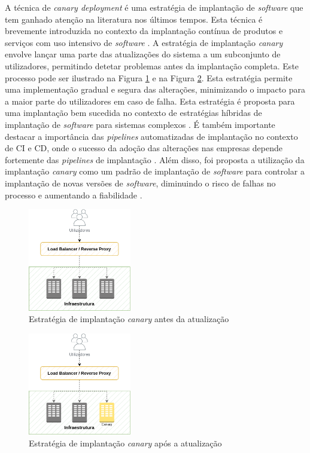 A técnica de \textit{canary deployment} é uma estratégia de implantação de \textit{software} que 
tem ganhado atenção na literatura nos últimos tempos. Esta técnica é brevemente introduzida no 
contexto da implantação contínua de produtos e serviços com uso intensivo de \textit{software} \cite{canary2017}. 
A estratégia de implantação \textit{canary} envolve lançar uma parte das atualizações do sistema a 
um subconjunto de utilizadores, permitindo detetar problemas antes da implantação completa.
Este processo pode ser ilustrado na Figura \ref{fig:canary-before} e na Figura \ref{fig:canary-after}. 
Esta estratégia permite uma implementação gradual e segura das alterações, minimizando o impacto 
para a maior parte do utilizadores em caso de falha. Esta estratégia é proposta para uma implantação 
bem sucedida no contexto de estratégias híbridas de implantação de \textit{software} para sistemas 
complexos \cite{canary2022}. É também importante destacar a importância das \textit{pipelines} 
automatizadas de implantação no contexto de \ac{CI} e \ac{CD}, onde o sucesso da adoção das 
alterações nas empresas depende fortemente das \textit{pipelines} de implantação 
\cite{canary2017b}. Além disso, foi proposta a utilização da implantação \textit{canary} como um 
padrão de implantação de \textit{software} para controlar a implantação de novas versões de 
\textit{software}, diminuindo o risco de falhas no processo e aumentando a fiabilidade 
\cite{canary2021}.

\begin{figure}[H]
    \centering
    \includegraphics[width=0.4\textwidth]{media/content/estado-arte/canary-before.png}
    \caption{Estratégia de implantação \textit{canary} antes da atualização}
    \label{fig:canary-before}
\end{figure}

\begin{figure}[H]
    \centering
    \includegraphics[width=0.4\textwidth]{media/content/estado-arte/canary-after.png}
    \caption{Estratégia de implantação \textit{canary} após a atualização}
    \label{fig:canary-after}
\end{figure}

